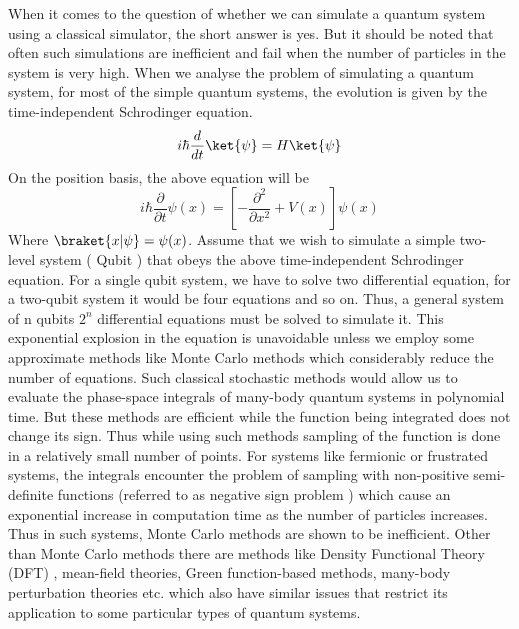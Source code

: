 When it comes to the question of whether we can simulate a quantum system using a classical simulator, the short answer is yes. But it should be noted that often such simulations are inefficient and fail when the number of particles in the system is very high.  When we analyse the problem of simulating a quantum system, for most of the simple quantum systems, the evolution is given by the time-independent Schrodinger equation. 
\begin{equation}
i\hbar \frac{d}{dt}\ket{\psi} = H \ket{\psi}
\end{equation}
On the position basis, the above equation will be 
\begin{equation}
i\hbar\frac{\partial}{\partial t}\psi(x)= [-\frac{\partial^{2}}{\partial x^{2}}+V(x)]\psi(x)
\end{equation}
Where $\braket{x|\psi} = \psi(x)$.
Assume that we wish to simulate a simple two-level system ( Qubit ) that obeys the above time-independent Schrodinger equation. For a single qubit system, we have to solve two differential equation, for a two-qubit system it would be four equations and so on. Thus, a general system of n qubits $2^{n}$ differential equations must be solved to simulate it. This exponential explosion in the equation is unavoidable unless we employ some approximate methods like Monte Carlo methods\cite{monte} which considerably reduce the number of equations. Such classical stochastic methods would allow us to evaluate the phase-space integrals of many-body quantum systems in polynomial time. But these methods are efficient while the function being integrated does not change its sign. Thus while using such methods sampling of the function is done in a relatively small number of points. For systems like fermionic or frustrated systems, the integrals encounter the problem of sampling with non-positive semi-definite functions (referred to as negative sign problem\cite{troyer} \cite{georgescu} ) which cause an exponential increase in computation time as the number of particles increases. Thus in such systems, Monte Carlo methods are shown to be inefficient. Other than Monte Carlo methods there are methods like Density Functional Theory (DFT) \cite{dft}, mean-field theories, Green function-based methods, many-body perturbation theories \cite{mbpt} etc. which also have similar issues that restrict its application to some particular types of quantum systems.

